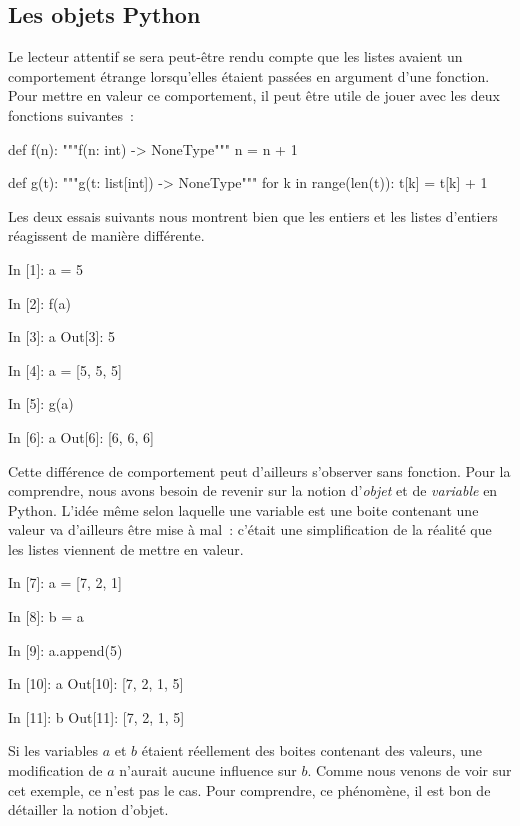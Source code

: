\documentclass{magnoliaold}
\begin{document}
\subsection{Les objets Python}

Le lecteur attentif se sera peut-être rendu compte que les listes avaient un comportement étrange lorsqu'elles
étaient passées en argument d'une fonction. Pour mettre en valeur ce comportement, il peut être utile de
jouer avec les deux fonctions suivantes~:

\begin{pythoncode}
def f(n):
    """f(n: int) -> NoneType"""
    n = n + 1

def g(t):
    """g(t: list[int]) -> NoneType"""
    for k in range(len(t)):
        t[k] = t[k] + 1
\end{pythoncode}

\noindent Les deux essais suivants nous montrent bien que les entiers et les listes d'entiers réagissent
de manière différente.
\begin{pythoncode}
In [1]: a = 5

In [2]: f(a)

In [3]: a
Out[3]: 5
\end{pythoncode}

\begin{pythoncode}
In [4]: a = [5, 5, 5]

In [5]: g(a)

In [6]: a
Out[6]: [6, 6, 6]
\end{pythoncode}

\noindent 
Cette différence de comportement peut d'ailleurs s'observer sans fonction. Pour la comprendre,
nous avons besoin de revenir sur la notion d'\emph{objet} et de \emph{variable} en Python. L'idée même selon
laquelle une variable est une boite contenant une valeur va d'ailleurs être mise à mal~: c'était une
simplification de la réalité que les listes viennent de mettre en valeur.

\begin{pythoncode}
In [7]: a = [7, 2, 1]

In [8]: b = a

In [9]: a.append(5)

In [10]: a
Out[10]: [7, 2, 1, 5]

In [11]: b
Out[11]: [7, 2, 1, 5]
\end{pythoncode}
\noindent
Si les variables $a$ et $b$ étaient réellement des boites contenant des valeurs, une modification de $a$
n'aurait aucune influence sur $b$. Comme nous venons de voir sur cet exemple, ce n'est pas le cas. Pour
comprendre, ce phénomène, il est bon de détailler la notion d'objet.\\
\end{document}
